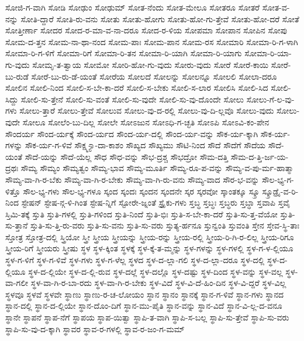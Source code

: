 {ಸೋಜಿ-ಗ-ವಾಗಿ
ಸೋಡಿ
ಸೋಢುಂ
ಸೋಢುಮ್
ಸೋತ-ನೆಂದು
ಸೋತ-ಮೇಲೂ
ಸೋತರೂ
ಸೋತರೆ
ಸೋತ-ವ-ನನ್ನು
ಸೋತಿ-ದ್ದಾರೆ
ಸೋತಿ-ರು-ವನು
ಸೋತು
ಸೋತು-ಹೋಗು
ಸೋತು-ಹೋ-ಗು-ತ್ತೇವೆ
ಸೋತು-ಹೋ-ದರೆ
ಸೋತೆ
ಸೋತ್ತೀರ್ಣಾ
ಸೋದರ
ಸೋದ-ರ-ಮಾ-ವ-ನಾ-ದರೂ
ಸೋದ-ರ-ಳಿಯ
ಸೋಪಮಾ
ಸೋಪಾನ
ಸೋಪಿನ
ಸೋಪು
ಸೋಮ-ದ-ತ್ತನ
ಸೋಮ-ನಾ-ಥಾ-ನಂದ
ಸೋಮ-ಪಾಃ
ಸೋಮ-ಪಾನ
ಸೋಮ-ರಸ
ಸೋಮಾರಿ
ಸೋಮಾ-ರಿ-ಗ-ಳಾಗಿ
ಸೋಮಾ-ರಿ-ಗ-ಳಿಗೆ
ಸೋಮಾ-ರಿಗೆ
ಸೋಮಾ-ರಿ-ತನ
ಸೋಮಾ-ರಿ-ಯಾಗಿ
ಸೋಮಾ-ರಿ-ಯಾಗು
ಸೋಮಾ-ರಿ-ಯಾ-ಗು-ವುದು
ಸೋಮೃ-ತ-ತ್ವಾಯ
ಸೋಮೋ
ಸೋರಿ-ಹೋ-ಗು-ವುದು
ಸೋರು-ವುದು
ಸೋರೆ
ಸೋರೆ-ಕಾಯಿ
ಸೋರೆ-ಬು-ರುಡೆ
ಸೋರೆ-ಬು-ರು-ಡೆ-ಯಂತೆ
ಸೋರೆಯ
ಸೋಲದೆ
ಸೋಲನ್ನು
ಸೋಲನ್ನೂ
ಸೋಲಲಿ
ಸೋಲಾ-ದರೂ
ಸೋಲಿನ
ಸೋಲಿ-ನಿಂದ
ಸೋಲಿ-ಸ-ಬೇ-ಕಾ-ದರೆ
ಸೋಲಿ-ಸ-ಬೇಕು
ಸೋಲಿ-ಸ-ಲಾರ
ಸೋಲಿಸಿ
ಸೋಲಿ-ಸಿದ
ಸೋಲಿ-ಸಿದ್ದು
ಸೋಲಿ-ಸು-ತ್ತೇನೆ
ಸೋಲಿ-ಸು-ವಂತೆ
ಸೋಲಿ-ಸು-ವುದೇ
ಸೋಲಿ-ಸು-ವು-ದೊಂದೇ
ಸೋಲು
ಸೋಲು-ಗೆ-ಲ-ವು-ಗಳು
ಸೋಲು-ತ್ತಾರೆ
ಸೋಲು-ತ್ತೇವೆ
ಸೋಲುವ
ಸೋಲು-ವು-ದ-ರಲ್ಲಿ
ಸೋಲು-ವು-ದಿ-ಲ್ಲವೊ
ಸೋಲು-ವುದು
ಸೋಲು-ವುದೇ
ಸೋಲೂ
ಸೋಲೆಂ-ಬು-ದಿಲ್ಲ
ಸೋಲೇ
ಸೋಽಜುನ
ಸೋಽಧಿ-ಗ-ಚ್ಛತಿ
ಸೋಽಪಿ
ಸೋಽವಿ-ಕಂ-ಪೇನ
ಸೌಂದರ್ಯ
ಸೌಂದ-ರ್ಯಕ್ಕೆ
ಸೌಂದ-ರ್ಯದ
ಸೌಂದ-ರ್ಯ-ದಲ್ಲಿ
ಸೌಂದ-ರ್ಯ-ವನ್ನು
ಸೌಕ-ರ್ಯ-ಕ್ಕಾಗಿ
ಸೌಕ-ರ್ಯ-ಗಳನ್ನು
ಸೌಕ-ರ್ಯ-ಗ-ಳಿವೆ
ಸೌಕ್ಷ್ಮ-್ಯಾ-ದಾ-ಕಾಶಂ
ಸೌಖ್ಯದ
ಸೌಖ್ಯಮು
ಸೌಟಿ-ನಿಂದ
ಸೌದೆ
ಸೌದೆಗೆ
ಸೌದೆಯ
ಸೌದೆ-ಯಂತೆ
ಸೌದೆ-ಯನ್ನು
ಸೌದೆ-ಯೆಲ್ಲ
ಸೌಧ
ಸೌಧ-ವನ್ನು
ಸೌಭ-ದ್ರಶ್ಚ
ಸೌಭದ್ರೋ
ಸೌಮ-ದತ್ತಿ
ಸೌಮ-ದ-ತ್ತಿ-ರ್ಜ-ಯ-ದ್ರಥಃ
ಸೌಮ್ಯ
ಸೌಮ್ಯಂ
ಸೌಮ್ಯತ್ವಂ
ಸೌಮ್ಯ-ಭಾವ
ಸೌಮ್ಯ-ಮೂರ್ತಿ
ಸೌಮ್ಯ-ರೂ-ಪ-ವನ್ನು
ಸೌಮ್ಯ-ವ-ಪು-ರ್ಮ-ಹಾತ್ಮಾ
ಸೌಮ್ಯ-ವಾ-ಗಿ-ರ-ಬೆಕು
ಸೌಮ್ಯ-ವಾ-ಗಿ-ರ-ಬೇಕು
ಸೌಮ್ಯ-ವಾ-ಗಿ-ರು-ವನು
ಸೌಮ್ಯ-ವಾದ
ಸೌರ-ಭ-ವನ್ನು
ಸೌಲ-ಭ್ಯ-ಗ-ಳಿತ್ತೊ
ಸೌಲ-ಭ್ಯ-ಗಳು
ಸೌಲ-ಭ್ಯ-ಗಳೂ
ಸ್ಕಂದ
ಸ್ಕಂದಃ
ಸ್ಕಂದನ
ಸ್ಕಂದನೇ
ಸ್ಕರ
ಸ್ಕರವೋ
ಸ್ಕಾಂತಕ್ಕೂ
ಸ್ಕ್ರೂ
ಸ್ಕ್ರೂಡ್ರೈ-ವ-ರಿ-ನಿಂದ
ಸ್ಟೇಷನ್
ಸ್ಟೇಷ-ನ್ಗ-ಳಿ-ಗಿಂತ
ಸ್ಟೇಷ-ನ್ನಿಗೆ
ಸ್ಟೋರೇ-ಜ್ನಂತೆ
ಸ್ಟ್ರೈಕು-ಗಳು
ಸ್ತಬ್ಧ
ಸ್ತಬ್ಧಃ
ಸ್ತಬ್ಧರು
ಸ್ತಬ್ಧಾ
ಸ್ತವಾಪಿ
ಸ್ತವೈ
ಸ್ತಿಮಿ-ತಕ್ಕೆ
ಸ್ತುತಿ
ಸ್ತುತಿ-ಗಳಲ್ಲಿ
ಸ್ತುತಿ-ಗಳಿಂದ
ಸ್ತುತಿ-ನಿಂದೆ
ಸ್ತುತಿ-ಭಿಃ
ಸ್ತುತಿ-ಸ-ಬೇ-ಕಾ-ದರೆ
ಸ್ತುತಿ-ಸು-ತ್ತ-ವೆಯೋ
ಸ್ತುತಿ-ಸು-ತ್ತಾನೆ
ಸ್ತುತಿ-ಸು-ತ್ತಿ-ರು-ವರು
ಸ್ತುತಿ-ಸು-ವನು
ಸ್ತುತಿ-ಸು-ವರು
ಸ್ತುತ್ಯ-ರ್ಹನೂ
ಸ್ತುನ್ವಂತಿ
ಸ್ತುವಂತಿ
ಸ್ತೇನ
ಸ್ತೇವ-ಸ್ಥಿ-ತಾಃ
ಸ್ತೋತ್ರ
ಸ್ತೋತ್ರ-ದಲ್ಲಿ
ಸ್ತ್ರಿಯೋ
ಸ್ತ್ರೀ
ಸ್ತ್ರೀಯ
ಸ್ತ್ರೀಯನ್ನು
ಸ್ತ್ರೀಯ-ರನ್ನು
ಸ್ತ್ರೀಯ-ರಲ್ಲಿ
ಸ್ತ್ರೀಯ-ರಿ-ಗಿ-ರ-ಲಿಲ್ಲ
ಸ್ತ್ರೀಯ-ರಿಗೂ
ಸ್ತ್ರೀಯ-ರಿಗೆ
ಸ್ತ್ರೀಯರು
ಸ್ತ್ರೀಷು
ಸ್ಥಳ
ಸ್ಥಳ-ಕ್ಕಿಂತ
ಸ್ಥಳಕ್ಕೆ
ಸ್ಥಳ-ಕ್ಕೆ-ತ-ಮ್ಮನ್ನು
ಸ್ಥಳ-ಗಳನ್ನು
ಸ್ಥಳ-ಗಳಲ್ಲಿ
ಸ್ಥಳ-ಗ-ಳ-ಲ್ಲಿಯೂ
ಸ್ಥಳ-ಗ-ಳಿಗೆ
ಸ್ಥಳ-ಗ-ಳಿವೆ
ಸ್ಥಳ-ಗಳು
ಸ್ಥಳ-ಗ-ಳೆಲ್ಲ
ಸ್ಥಳದ
ಸ್ಥಳ-ದ-ಲ್ಲಾ-ಗಲಿ
ಸ್ಥಳ-ದ-ಲ್ಲಾ-ದರೂ
ಸ್ಥಳ-ದಲ್ಲಿ
ಸ್ಥಳ-ದ-ಲ್ಲಿಯೂ
ಸ್ಥಳ-ದ-ಲ್ಲಿಯೇ
ಸ್ಥಳ-ದ-ಲ್ಲಿ-ರುವ
ಸ್ಥಳ-ದಲ್ಲೆ
ಸ್ಥಳ-ದಲ್ಲೊ
ಸ್ಥಳ-ದಷ್ಟು
ಸ್ಥಳ-ದಿಂದ
ಸ್ಥಳ-ವನ್ನು
ಸ್ಥಳ-ವಲ್ಲ
ಸ್ಥಳ-ವಾ-ಗಲೀ
ಸ್ಥಳ-ವಾ-ಗಿ-ರ-ಬಾ-ರದು
ಸ್ಥಳ-ವಾ-ಗಿ-ರ-ಬೇಕು
ಸ್ಥಳ-ವಿದೆ
ಸ್ಥಳ-ವಿ-ದೆ-ಹಿಂ-ದಿನ
ಸ್ಥಳ-ವಿ-ದ್ದರೆ
ಸ್ಥಳ-ವಿಲ್ಲ
ಸ್ಥಳವೂ
ಸ್ಥಳವೆ
ಸ್ಥಳವೇ
ಸ್ಥಾಣು
ಸ್ಥಾಣು-ರ-ಚ-ಲೋಯಂ
ಸ್ಥಾನ
ಸ್ಥಾನಂ
ಸ್ಥಾನಕ್ಕೆ
ಸ್ಥಾನ-ಗ-ಳಿವೆ
ಸ್ಥಾನ-ಗಳು
ಸ್ಥಾನದ
ಸ್ಥಾನ-ದಲ್ಲಿ
ಸ್ಥಾನ-ದ-ಲ್ಲಿಯೇ
ಸ್ಥಾನ-ದೊಂ-ದಿಗೆ
ಸ್ಥಾನ-ಮು-ಪೈತಿ
ಸ್ಥಾನ-ವನ್ನು
ಸ್ಥಾನ-ವಿದೆ
ಸ್ಥಾನ-ವಿ-ಲ್ಲ-ದ-ವನೂ
ಸ್ಥಾನೇ
ಸ್ಥಾಪನೆ
ಸ್ಥಾಪ-ನೆಗೆ
ಸ್ಥಾಪಯ
ಸ್ಥಾಪ-ಯಿತ್ವಾ
ಸ್ಥಾಪಿ-ತ-ವಾಗಿ
ಸ್ಥಾಪಿ-ಸ-ಬಲ್ಲ
ಸ್ಥಾಪಿ-ಸು-ತ್ತೇವೆ
ಸ್ಥಾಪಿ-ಸು-ವರು
ಸ್ಥಾಪಿ-ಸು-ವು-ದ-ಕ್ಕಾಗಿ
ಸ್ಥಾವರ
ಸ್ಥಾವ-ರ-ಗಳಲ್ಲಿ
ಸ್ಥಾವ-ರ-ಜಂ-ಗ-ಮಮ್
}
